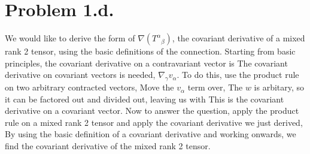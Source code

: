 \documentclass{article}
\begin{document}
\section*{Problem 1.d.}
We would like to derive the form of $\nabla({T^\alpha}_\beta)$, the covariant derivative of a mixed rank 2 tensor, using the basic definitions of the connection. Starting from basic principles, the covariant derivative on a contravariant vector is
The covariant derivative on covariant vectors is needed, $\nabla_\gamma v_\alpha$. To do this, use the product rule on two arbitrary contracted vectors,
Move the $v_\alpha$ term over,
The $w$ is arbitary, so it can be factored out and divided out, leaving us with
This is the covariant derivative on a covariant vector. Now to answer the question, apply the product rule on a mixed rank 2 tensor and apply the covariant derivative we just derived,
By using the basic definition of a covariant derivative and working onwards, we find the covariant derivative of the mixed rank 2 tensor.
\end{document}

